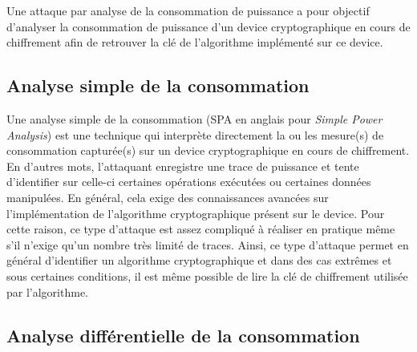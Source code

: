 \documentclass[oneside]{book}
\begin{document}
Une attaque par analyse de la consommation de puissance a pour objectif d'analyser la consommation de puissance d'un device cryptographique en cours de chiffrement afin de retrouver la clé de l'algorithme implémenté sur ce device.

\subsection{Analyse simple de la consommation}
\label{sec:SPA}

Une analyse simple de la consommation (SPA en anglais pour \textit{Simple Power Analysis}) est une technique qui interprète directement la ou les mesure(s) de consommation capturée(s) sur un device cryptographique en cours de chiffrement. En d'autres mots, l'attaquant enregistre une trace de puissance et tente d'identifier sur celle-ci certaines opérations exécutées ou certaines données manipulées. En général, cela exige des connaissances avancées sur l'implémentation de l'algorithme cryptographique présent sur le device. Pour cette raison, ce type d'attaque est assez compliqué à réaliser en pratique même s'il n'exige qu'un nombre très limité de traces. Ainsi, ce type d'attaque permet en général d'identifier un algorithme cryptographique et dans des cas extrêmes et sous certaines conditions, il est même possible de lire la clé de chiffrement utilisée par l'algorithme.


\subsection{Analyse différentielle de la consommation}
\label{sec:DPA}
\end{document}
